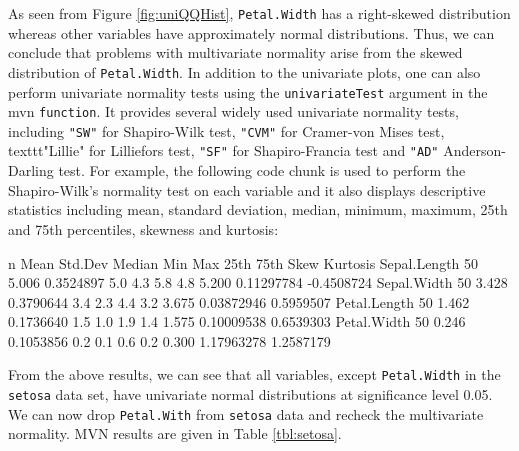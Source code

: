 \documentclass[11pt]{article}
\begin{document}
As seen from Figure \ref{fig:uniQQHist}, \texttt{Petal.Width} has a right-skewed distribution whereas other variables have approximately normal distributions. Thus, we can conclude that problems with multivariate normality arise from the skewed distribution of \texttt{Petal.Width}. In addition to the univariate plots, one can also perform univariate normality tests using the \texttt{univariateTest} argument in the mvn \texttt{function}. It provides several widely used univariate normality tests, including \texttt{"SW"} for Shapiro-Wilk test, \texttt{"CVM"} for Cramer-von Mises test, texttt{"Lillie"} for Lilliefors test,  \texttt{"SF"} for Shapiro-Francia test and  \texttt{"AD"} Anderson-Darling test. For example, the following code chunk is used to perform the Shapiro-Wilk's normality test on each variable and it also displays descriptive statistics including mean, standard deviation, median, minimum, maximum, 25th and 75th percentiles, skewness and kurtosis:

\begin{Schunk}
\end{Schunk}

\begin{Schunk}
\begin{Soutput}
              n  Mean   Std.Dev Median Min Max 25th  75th       Skew   Kurtosis
Sepal.Length 50 5.006 0.3524897    5.0 4.3 5.8  4.8 5.200 0.11297784 -0.4508724
Sepal.Width  50 3.428 0.3790644    3.4 2.3 4.4  3.2 3.675 0.03872946  0.5959507
Petal.Length 50 1.462 0.1736640    1.5 1.0 1.9  1.4 1.575 0.10009538  0.6539303
Petal.Width  50 0.246 0.1053856    0.2 0.1 0.6  0.2 0.300 1.17963278  1.2587179
\end{Soutput}
\end{Schunk}

From the above results, we can see that all variables, except \texttt{Petal.Width} in the \texttt{setosa} data set, have univariate normal distributions at significance level 0.05. We can now drop \texttt{Petal.With} from \texttt{setosa} data and recheck the multivariate normality. MVN results are given in Table \ref{tbl:setosa}.
\end{document}
